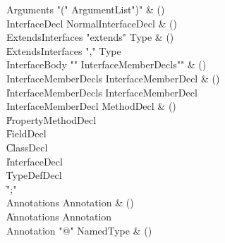 \begin{bbgrammar}
 Arguments  \label{prod:Arguments}  \: \xcd"(" ArgumentList\opt \xcd")" & ()\\
 InterfaceDecl  \label{prod:InterfaceDecl}  \: NormalInterfaceDecl & ()\\
 ExtendsInterfaces  \label{prod:ExtendsInterfaces}  \: \xcd"extends" Type & ()\\
    \| ExtendsInterfaces \xcd"," Type\\
 InterfaceBody  \label{prod:InterfaceBody}  \: \xcd"{" InterfaceMemberDecls\opt \xcd"}" & ()\\
 InterfaceMemberDecls  \label{prod:InterfaceMemberDecls}  \: InterfaceMemberDecl & ()\\
    \| InterfaceMemberDecls InterfaceMemberDecl\\
 InterfaceMemberDecl  \label{prod:InterfaceMemberDecl}  \: MethodDecl & ()\\
    \| PropertyMethodDecl\\
    \| FieldDecl\\
    \| ClassDecl\\
    \| InterfaceDecl\\
    \| TypeDefDecl\\
    \| \xcd";"\\
 Annotations  \label{prod:Annotations}  \: Annotation & ()\\
    \| Annotations Annotation\\
 Annotation  \label{prod:Annotation}  \: \xcd"@" NamedType & ()\\
\end{bbgrammar}

